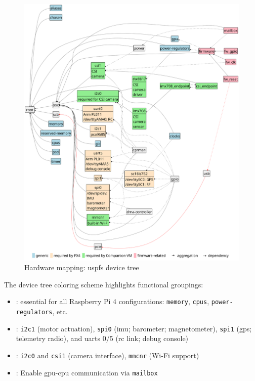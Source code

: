 \begin{figure}[!hbt]
  \centering
  \includegraphics[width=1.0\textwidth]{./img/pdf/hw-map-1} 
  \caption[Hardware mapping: USPFS device tree]{Hardware mapping: \gls{uspfs}
  device tree}%
  \label{fig:hw-map-1}
\end{figure}


The device tree coloring scheme highlights functional groupings:
\begin{itemize}[noitemsep,topsep=0pt]
%
\item {}: essential for all Raspberry Pi
  4 configurations: \lstinline{memory}, \lstinline{cpus},
  \lstinline{power-regulators}, etc.
%
\item {}: \lstinline{i2c1} (motor
  actuation), \lstinline{spi0} (\gls{imu}; barometer; magnetometer),
  \lstinline{spi1} (\gls{gps}; telemetry radio), and \glspl{uart} 0/5 (\gls{rc}
  link; debug console)
%
\item {}: \lstinline{i2c0} and
  \lstinline{csi1} (camera interface), \lstinline{mmcnr} (Wi-Fi support)
%
\item {}: Enable \gls{gpu}-\gls{cpu} communication via \lstinline{mailbox}~\cite{rpi4-fw-mbox}
\end{itemize}

